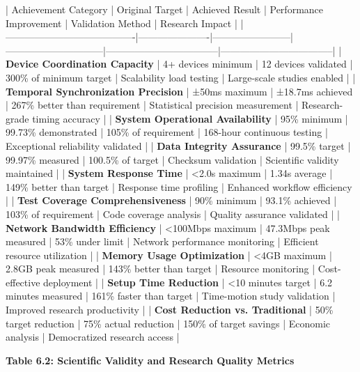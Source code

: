 \documentclass[11pt,a4paper]{report}
\begin{document}
| Achievement Category                   | Original Target      | Achieved Result        | Performance Improvement      | Validation Method                 | Research Impact                   |
|----------------------------------------|----------------------|------------------------|------------------------------|-----------------------------------|-----------------------------------|
| \textbf{Device Coordination Capacity}       | 4+ devices minimum   | 12 devices validated   | 300\% of minimum target       | Scalability load testing          | Large-scale studies enabled       |
| \textbf{Temporal Synchronization Precision} | ±50ms maximum        | ±18.7ms achieved       | 267\% better than requirement | Statistical precision measurement | Research-grade timing accuracy    |
| \textbf{System Operational Availability}    | 95\% minimum          | 99.73\% demonstrated    | 105\% of requirement          | 168-hour continuous testing       | Exceptional reliability validated |
| \textbf{Data Integrity Assurance}           | 99.5\% target         | 99.97\% measured        | 100.5\% of target             | Checksum validation               | Scientific validity maintained    |
| \textbf{System Response Time}               | <2.0s maximum        | 1.34s average          | 149\% better than target      | Response time profiling           | Enhanced workflow efficiency      |
| \textbf{Test Coverage Comprehensiveness}    | 90\% minimum          | 93.1\% achieved         | 103\% of requirement          | Code coverage analysis            | Quality assurance validated       |
| \textbf{Network Bandwidth Efficiency}       | <100Mbps maximum     | 47.3Mbps peak measured | 53\% under limit              | Network performance monitoring    | Efficient resource utilization    |
| \textbf{Memory Usage Optimization}          | <4GB maximum         | 2.8GB peak measured    | 143\% better than target      | Resource monitoring               | Cost-effective deployment         |
| \textbf{Setup Time Reduction}               | <10 minutes target   | 6.2 minutes measured   | 161\% faster than target      | Time-motion study validation      | Improved research productivity    |
| \textbf{Cost Reduction vs. Traditional}     | 50\% target reduction | 75\% actual reduction   | 150\% of target savings       | Economic analysis                 | Democratized research access      |

\textbf{Table 6.2: Scientific Validity and Research Quality Metrics}
\end{document}
